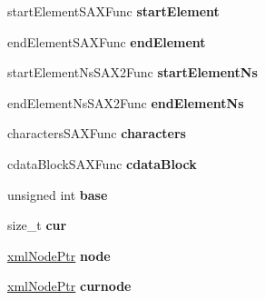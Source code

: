 \begin{DoxyCompactItemize}
\item 
\hypertarget{struct__xmlTextReader_a9daec0e70f77f079c850e296202014ac}{
startElementSAXFunc {\bfseries startElement}}
\label{struct__xmlTextReader_a9daec0e70f77f079c850e296202014ac}

\item 
\hypertarget{struct__xmlTextReader_a63fb520550fb0583f01ee4fbbc8d3344}{
endElementSAXFunc {\bfseries endElement}}
\label{struct__xmlTextReader_a63fb520550fb0583f01ee4fbbc8d3344}

\item 
\hypertarget{struct__xmlTextReader_a2b7ccd8e49727f18e8e3a58e0d1c8995}{
startElementNsSAX2Func {\bfseries startElementNs}}
\label{struct__xmlTextReader_a2b7ccd8e49727f18e8e3a58e0d1c8995}

\item 
\hypertarget{struct__xmlTextReader_a621e7e4255b4420ce15935bb4305d49a}{
endElementNsSAX2Func {\bfseries endElementNs}}
\label{struct__xmlTextReader_a621e7e4255b4420ce15935bb4305d49a}

\item 
\hypertarget{struct__xmlTextReader_a87b4104a412877513f16aa24dd5cbfe9}{
charactersSAXFunc {\bfseries characters}}
\label{struct__xmlTextReader_a87b4104a412877513f16aa24dd5cbfe9}

\item 
\hypertarget{struct__xmlTextReader_a5f8c88da2ab4f5aa51342df6db7c7e4d}{
cdataBlockSAXFunc {\bfseries cdataBlock}}
\label{struct__xmlTextReader_a5f8c88da2ab4f5aa51342df6db7c7e4d}

\item 
\hypertarget{struct__xmlTextReader_a5792727e8ba5ccb6441bffd465a8e05f}{
unsigned int {\bfseries base}}
\label{struct__xmlTextReader_a5792727e8ba5ccb6441bffd465a8e05f}

\item 
\hypertarget{struct__xmlTextReader_a7716cb83db74d8d25215999ca37e5f41}{
size\_\-t {\bfseries cur}}
\label{struct__xmlTextReader_a7716cb83db74d8d25215999ca37e5f41}

\item 
\hypertarget{struct__xmlTextReader_a96a76d5aa9b4958c3d43ef38dccd1c0b}{
\hyperlink{struct__xmlNode}{xmlNodePtr} {\bfseries node}}
\label{struct__xmlTextReader_a96a76d5aa9b4958c3d43ef38dccd1c0b}

\item 
\hypertarget{struct__xmlTextReader_a35f0b1d346b9714e4091af29168c6151}{
\hyperlink{struct__xmlNode}{xmlNodePtr} {\bfseries curnode}}
\label{struct__xmlTextReader_a35f0b1d346b9714e4091af29168c6151}


\end{DoxyCompactItemize}
